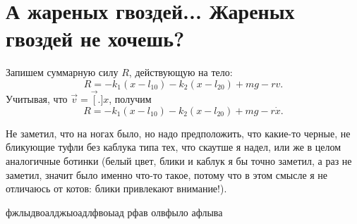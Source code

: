 \documentclass[russian, 12pt]{article}
\begin{document}
\section{А жареных гвоздей... Жареных гвоздей не хочешь?}
Запишем суммарную силу $R$, действующую на тело:
\[
 R = - k_1 (x - l_{10}) - k_2 (x - l_{20}) + m g - r  v.
\]
Учитывая, что $\vec v = \vec[.]x$, получим
\[
 R = - k_1 (x - l_{10}) - k_2 (x - l_{20}) + m g - r \dot x.
\]

Не заметил, что на ногах было, но надо предположить, что какие-то черные, не бликующие туфли без каблука типа тех, что скаутше я надел, или же в целом аналогичные ботинки (белый цвет, блики и каблук я бы точно заметил, а раз не заметил, значит было именно что-то такое, потому что в этом смысле я не отличаюсь от котов: блики привлекают внимание!).

фжлыдвоалджыоадлфвоыад рфав олвфыло афлыва
\end{document}
